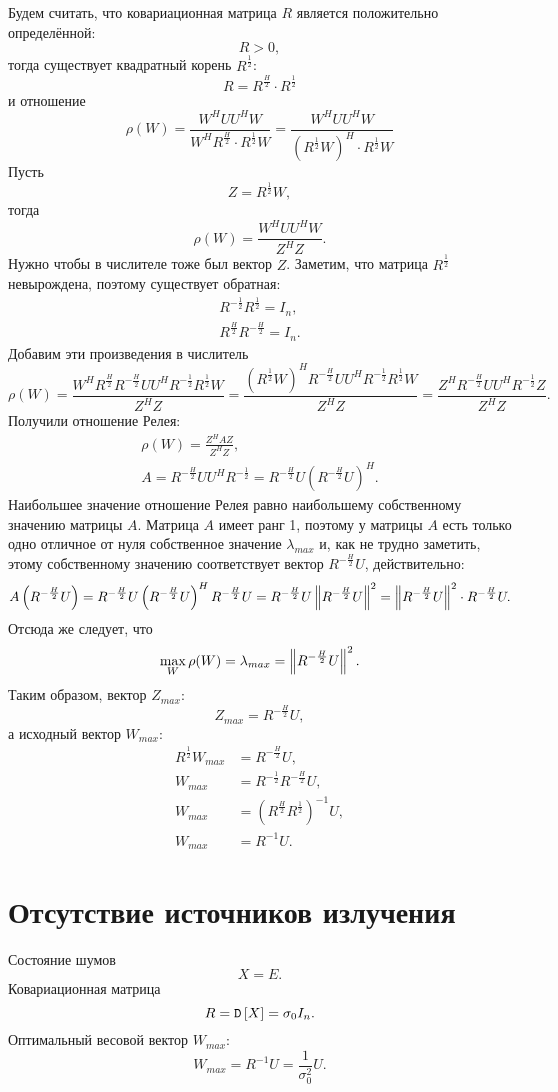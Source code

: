 Будем считать, что ковариационная матрица $R$ является положительно определённой:
\[
    R > 0 ,
\]
тогда существует квадратный корень $R^\frac{1}{2}$:
\[
    R = R^\frac{H}{2} \cdot R^\frac{1}{2}
\]
и отношение
\[
    \rho ( W )
    = \frac{W^H U U^H W}{W^H R^\frac{H}{2} \cdot R^\frac{1}{2} W}
    = \frac{W^H U U^H W}{\left ( R^\frac{1}{2} W \right )^H \cdot R^\frac{1}{2} W}
\]
Пусть
\[
    Z = R^\frac{1}{2} W ,
\]
тогда
\[
    \rho ( W ) = \frac{W^H U U^H W}{Z^H Z} .
\]
Нужно чтобы в числителе тоже был вектор $Z$. Заметим, что матрица $R^\frac{1}{2}$ невырождена, поэтому существует обратная:
\begin{gather*}
    R^{-\frac{1}{2}} R^\frac{1}{2} = I_n , \\
    R^{\frac{H}{2}} R^{-\frac{H}{2}} = I_n .
\end{gather*}
Добавим эти произведения в числитель
\[
    \rho ( W )
    = \frac{W^H R^\frac{H}{2} R^{-\frac{H}{2}} U U^H R^{-\frac{1}{2}} R^\frac{1}{2} W}{Z^H Z}
    = \frac{\left (  R^\frac{1}{2} W \right )^H R^{-\frac{H}{2}} U U^H R^{-\frac{1}{2}} R^\frac{1}{2} W}{Z^H Z}
    = \frac{Z^H R^{-\frac{H}{2}} U U^H R^{-\frac{1}{2}} Z}{Z^H Z} .
\]
Получили отношение Релея:
\begin{gather*}
    \rho ( W ) = \frac{Z^H A Z}{Z^H Z} , \\
    A = R^{-\frac{H}{2}} U U^H R^{-\frac{1}{2}} = R^{-\frac{H}{2}} U \left ( R^{-\frac{H}{2}} U \right )^H.
\end{gather*}
Наибольшее значение отношение Релея равно наибольшему собственному значению матрицы $A$. Матрица $A$ имеет ранг 1, поэтому у матрицы $A$ есть только одно
отличное от нуля собственное значение $\lambda_{max}$ и, как не трудно заметить, этому собственному значению соответствует вектор $R^{-\frac{H}{2}} U$,
действительно:
\[
    A \left ( R^{-\frac{H}{2}} U \right )
    = R^{-\frac{H}{2}} U \left ( R^{-\frac{H}{2}} U \right )^H R^{-\frac{H}{2}} U
    = R^{-\frac{H}{2}} U \left \| R^{-\frac{H}{2}} U \right \|^2
    = \left \| R^{-\frac{H}{2}} U \right \|^2 \cdot R^{-\frac{H}{2}} U .
\]
Отсюда же следует, что
\[
    \max \limits_W \rho(W) = \lambda_{max} = \left \| R^{-\frac{H}{2}} U \right \|^2 .
\]
Таким образом, вектор $Z_{max}$:
\[
    Z_{max} = R^{-\frac{H}{2}} U ,
\]
а исходный вектор $W_{max}$:
\begin{align*}
    R^{\frac{1}{2}} W_{max} & = R^{-\frac{H}{2}} U , \\
    W_{max} & = R^{-\frac{1}{2}} R^{-\frac{H}{2}} U , \\
    W_{max} & = \left ( R^{\frac{H}{2}} R^{\frac{1}{2}} \right )^{-1} U , \\
    W_{max} & = R^{-1} U .
\end{align*}


\section{Отсутствие источников излучения}

Состояние шумов
\[
    X = E .
\]
Ковариационная матрица
\[
    R = \mathtt{D} \left [ X \right ] = \sigma_0 I_n .
\]
Оптимальный весовой вектор $W_{max}$:
\[
    W_{max}
    = R^{-1} U
    = \frac{1}{\sigma_0^2} U .
\]

